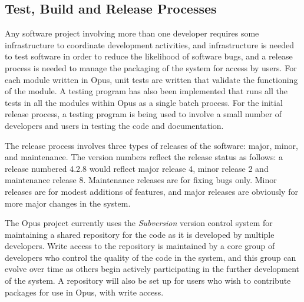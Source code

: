 \subsection{Test, Build and Release Processes}
Any software project involving more than one developer requires some infrastructure to coordinate development activities, and infrastructure is needed to test software in order to reduce the likelihood of software bugs, and a release process is needed to manage the packaging of the system for access by users.  For each module written in Opus, unit tests are written that validate the functioning of the module. A testing program has also been implemented that runs all the tests in all the modules within Opus as a single batch process.  
For the initial release process, a testing program is being used to involve a small number of developers and users in testing the code and documentation.  

The release process involves three types of releases of the software: major, minor, and maintenance. The version numbers reflect the release status as follows: a release numbered 4.2.8 would reflect major release 4, minor release 2 and maintenance release 8.  Maintenance releases are for fixing bugs only.  Minor releases are for modest additions of features, and major releases are obviously for more major changes in the system.

The Opus project currently uses the \emph{Subversion} version control system for maintaining a shared repository for the code as it is developed by multiple developers. Write access to the repository is maintained by a core group of developers who control the quality of the code in the system, and this group can evolve over time as others begin actively participating in the further development of the system. A repository will also be set up for users who wish to contribute packages for use in Opus, with write access.
